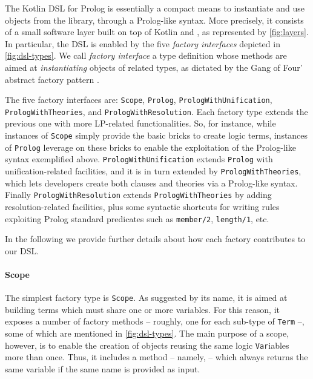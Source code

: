 \documentclass[12pt,a4paper,openright,twoside]{book}
\begin{document}
The Kotlin DSL for Prolog is essentially a compact means to instantiate and use objects from the \twopkt{} library, through a Prolog-like syntax.
%
More precisely, it consists of a small software layer built on top of Kotlin and \twopkt{}, as represented by \cref{fig:layers}.
%
In particular, the DSL is enabled by the five \emph{factory interfaces} depicted in \cref{fig:dsl-types}.
%
We call \emph{factory interface} a type definition whose methods are aimed at \emph{instantiating} objects of related types, as dictated by the Gang of Four' abstract factory pattern \cite{GammaHelmEtAl95}.

The five factory interfaces are: \texttt{Scope}, \texttt{Prolog}, \texttt{Pro\-log\-Wi\-th\-Uni\-fi\-ca\-tion}, \texttt{Pro\-logWi\-thTheo\-ries}, and \texttt{PrologWithResolution}.
%
Each factory type extends the previous one with more LP-related functionalities.
%
So, for instance, while instances of \texttt{Scope} simply provide the basic bricks to create logic terms, instances of \texttt{Prolog} leverage on these bricks to enable the exploitation of the Prolog-like syntax exemplified above.
%
\texttt{PrologWithUnification} extends \texttt{Prolog} with u\-ni\-fi\-ca\-tion-re\-la\-ted facilities, and it is in turn extended by \texttt{Pro\-log\-Wi\-th\-Theo\-ries}, which lets developers create both clauses and theories via a Prolog-like syntax.
%
Finally \texttt{PrologWithResolution} extends \texttt{PrologWi\-thTheories} by adding resolution-related facilities, plus some syntactic shortcuts for writing rules exploiting Prolog standard predicates such as \texttt{member/2}, \texttt{len\-gth/1}, etc.

In the following we provide further details about how each factory contributes to our DSL.

\paragraph{Scope}

The simplest factory type is \texttt{Scope}.
%
As suggested by its name, it is aimed at building terms which must share one or more variables.
%
For this reason, it exposes a number of factory methods -- roughly, one for each sub-type of \texttt{Term} --, some of which are mentioned in \cref{fig:dsl-types}.
%
The main purpose of a scope, however, is to enable the creation of objects reusing the same logic \texttt{Var}iables more than once.
%
Thus, it includes a method -- namely,  -- which always returns the same variable if the same name is provided as input.
\end{document}
